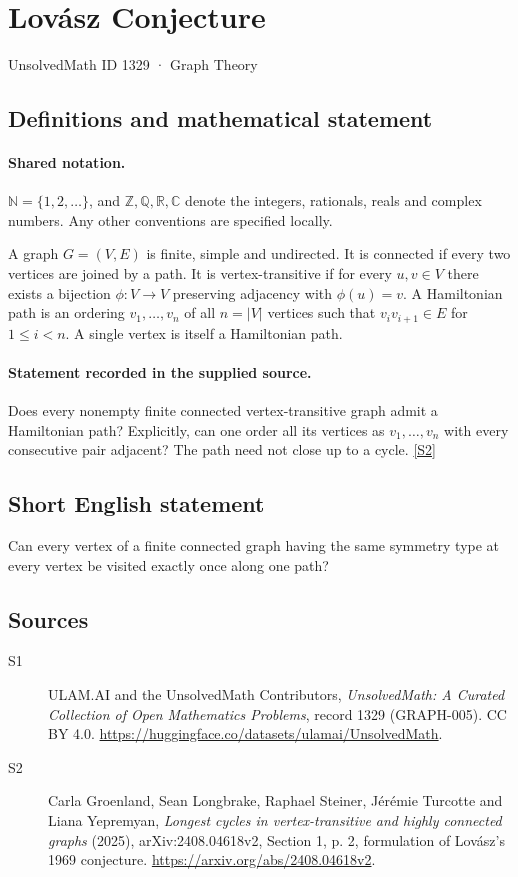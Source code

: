 \documentclass[11pt]{article}
\newcommand{\sref}[2]{\hyperlink{source:#1:#2}{[S#2]}}
\begin{document}
\setcounter{section}{1328}
\section{Lovász Conjecture}\label{1329}
{\small\sffamily UnsolvedMath ID 1329 · Graph Theory}
\subsection{Definitions and mathematical statement}

\paragraph{Shared notation.}$\mathbb N=\{1,2,\ldots\}$, and $\mathbb Z,\mathbb Q,\mathbb R,\mathbb C$ denote the integers, rationals, reals and complex numbers. Any other conventions are specified locally.


A graph $G=(V,E)$ is finite, simple and undirected. It is connected if every two vertices are joined by a path. It is vertex-transitive if for every $u,v\in V$ there exists a bijection $\phi:V\to V$ preserving adjacency with $\phi(u)=v$. A Hamiltonian path is an ordering $v_1,\ldots,v_n$ of all $n=|V|$ vertices such that $v_iv_{i+1}\in E$ for $1\le i<n$. A single vertex is itself a Hamiltonian path.
\paragraph{Statement recorded in the supplied source.}
Does every nonempty finite connected vertex-transitive graph admit a Hamiltonian path? Explicitly, can one order all its vertices as $v_1,\ldots,v_n$ with every consecutive pair adjacent? The path need not close up to a cycle. \sref{1329}{2}
\subsection{Short English statement}
Can every vertex of a finite connected graph having the same symmetry type at every vertex be visited exactly once along one path?
\subsection{Sources}
\begin{description}
\item[\hypertarget{source:1329:1}{S1}] ULAM.AI and the UnsolvedMath Contributors, \emph{UnsolvedMath: A Curated Collection of Open Mathematics Problems}, record 1329 (GRAPH-005). CC BY 4.0. \url{https://huggingface.co/datasets/ulamai/UnsolvedMath}.
\item[\hypertarget{source:1329:2}{S2}] Carla Groenland, Sean Longbrake, Raphael Steiner, J\'er\'emie Turcotte and Liana Yepremyan, \emph{Longest cycles in vertex-transitive and highly connected graphs} (2025), arXiv:2408.04618v2, Section 1, p. 2, formulation of Lov\'asz's 1969 conjecture. \url{https://arxiv.org/abs/2408.04618v2}.
\end{description}
\label{end:1329}
\end{document}
